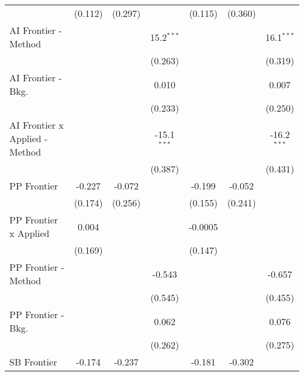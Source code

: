 \begin{tabular}{lcccccc}
                                  & (0.112)        & (0.297)        &                & (0.115)        & (0.360)        &   \\   
   AI Frontier - Method           &                &                & 15.2$^{***}$   &                &                & 16.1$^{***}$\\   
                                  &                &                & (0.263)        &                &                & (0.319)\\   
   AI Frontier - Bkg.             &                &                & 0.010          &                &                & 0.007\\   
                                  &                &                & (0.233)        &                &                & (0.250)\\   
   AI Frontier x Applied - Method &                &                & -15.1$^{***}$  &                &                & -16.2$^{***}$\\   
                                  &                &                & (0.387)        &                &                & (0.431)\\   
   PP Frontier                    & -0.227         & -0.072         &                & -0.199         & -0.052         &   \\   
                                  & (0.174)        & (0.256)        &                & (0.155)        & (0.241)        &   \\   
   PP Frontier x Applied          & 0.004          &                &                & -0.0005        &                &   \\   
                                  & (0.169)        &                &                & (0.147)        &                &   \\   
   PP Frontier - Method           &                &                & -0.543         &                &                & -0.657\\   
                                  &                &                & (0.545)        &                &                & (0.455)\\   
   PP Frontier - Bkg.             &                &                & 0.062          &                &                & 0.076\\   
                                  &                &                & (0.262)        &                &                & (0.275)\\   
   SB Frontier                    & -0.174         & -0.237         &                & -0.181         & -0.302         &   \\   

\end{tabular}
